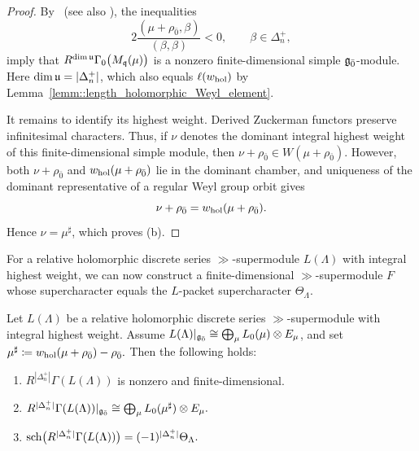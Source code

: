 \begin{proof}
By~\cite[Fact~2.22 and Remark~2.23]
{kitagawa2025construction} (see also
\cite[Corollary~4.160]{KnappVogan1995}), the inequalities
\[
2\frac{(\mu+\rho_{\bar0},\beta)}{(\beta,\beta)}<0,
\qquad \beta\in\Delta_n^+,
\]
imply that
$
R^{\dim{\mathfrak u}}\Gamma_0\bigl(M_{{\mathfrak q}}(\mu)\bigr)
$
is a nonzero finite-dimensional simple
${\mathfrak{g}_{\bar{0}}}$-module.
Here $\dim{\mathfrak u}=\vert \Delta_{n}^{+}\vert$, which also equals
$\ell(w_{\operatorname{hol}})$ by
Lemma~\ref{lemm::length_holomorphic_Weyl_element}.

It remains to identify its highest weight.
Derived Zuckerman functors preserve infinitesimal
characters. Thus, if $\nu$ denotes the dominant
integral highest weight of this finite-dimensional
simple module, then
$
\nu+\rho_{\bar0}
\in W(\mu+\rho_{\bar0}).
$ However,
both $\nu+\rho_{\bar0}$ and
$w_{\operatorname{hol}}(\mu+\rho_{\bar0})$ lie in the dominant
chamber, and uniqueness of the dominant representative
of a regular Weyl group orbit gives
\[
\nu+\rho_{\bar0}
=
w_{\operatorname{hol}}(\mu+\rho_{\bar0}).
\]
Hence $\nu=\mu^\sharp$, which proves (b).
\end{proof}

For a relative holomorphic discrete series $\gg$-supermodule $L(\Lambda)$ with integral highest weight, we can now construct a finite-dimensional $\gg$-supermodule $F$ whose supercharacter equals the $L$-packet supercharacter $\Theta_\Lambda$.

\begin{corollary}
\label{cor::Zuckerman_packet_character}
Let $L(\Lambda)$ be a relative holomorphic discrete series $\gg$-supermodule with integral highest weight. Assume $
L(\Lambda)|_{{\mathfrak{g}_{\bar{0}}}}
\cong
\bigoplus_\mu L_0(\mu)\otimes E_\mu
$, and set
$
\mu^\sharp
\coloneqq
w_{\operatorname{hol}}(\mu+\rho_{\bar0})-\rho_{\bar0}.
$
Then the following holds:
\begin{enumerate}
    \item[(a)] $R^{|\Delta_n^+|}\Gamma(L(\Lambda))$ is nonzero and finite-dimensional.
    \item[(b)] $R^{|\Delta_n^+|}\Gamma(L(\Lambda))|_{{\mathfrak{g}_{\bar{0}}}}
\cong
\bigoplus_\mu L_0(\mu^\sharp)\otimes E_\mu.$
\item[(c)] ${\operatorname{sch}}\bigl(R^{|\Delta_n^+|}\Gamma(L(\Lambda))\bigr)
=
(-1)^{|\Delta_n^+|}\Theta_\Lambda.$
\end{enumerate}
\end{corollary}

